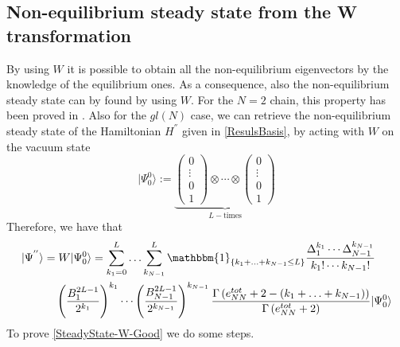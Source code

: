 \documentclass[10pt]{article}
\numberwithin{equation}{section}
\numberwithin{equation}{subsection}
\begin{document}
\subsection{Non-equilibrium steady state from the W transformation}
By using $W$ it is possible to obtain all the non-equilibrium eigenvectors by the knowledge of the equilibrium ones. As a consequence, also the non-equilibrium steady state can by found by using $W$. For the $N=2$ chain, this property has been proved in \cite{frassek2020eigenstates}. Also for the $gl(N)$ case, we can retrieve the non-equilibrium steady state of the Hamiltonian $H^{''}$ given in \eqref{ResulsBasis}, by acting with $W$ on the vacuum state 
\begin{equation}
	|\Psi_{0}^{0}\rangle:=\underbrace{\begin{pmatrix}
		0\\
		\vdots\\
		0\\
		1
	\end{pmatrix}\otimes \cdots \otimes\begin{pmatrix}
		0\\
		\vdots\\
		0\\
		1
	\end{pmatrix}}_{L-\text{times}}
\end{equation}
Therefore, we have that 
\begin{equation}\label{SteadyState-W-Good}
	\begin{split}
		|\Psi^{''}\rangle=&	\;W|\Psi_{0}^{0}\rangle =\sum_{k_{1}=0}^{L}\ldots\sum_{k_{N-1}}^{L}\mathbbm{1}_{\{k_{1}+\ldots+k_{N-1}\leq L\}}\frac{\Delta_{1}^{k_{1}}\cdots \Delta_{N-1}^{k_{N-1}}}{k_{1}!\cdots k_{N-1}!}\\&
		\left(\frac{B_{1}^{2L-1}}{2^{k_{1}}}\right)^{k_{1}}\cdots\left( \frac{B_{N-1}^{2L-1}}{2^{k_{N-1}}}\right)^{k_{N-1}}\frac{\Gamma\left(e_{NN}^{tot}+2-(k_{1}+\ldots+k_{N-1})\right)}{\Gamma\left(e_{NN}^{tot}+2\right)}|\Psi_{0}^{0}\rangle
	\end{split}
\end{equation}
To prove \eqref{SteadyState-W-Good} we do some steps. 
\end{document}
